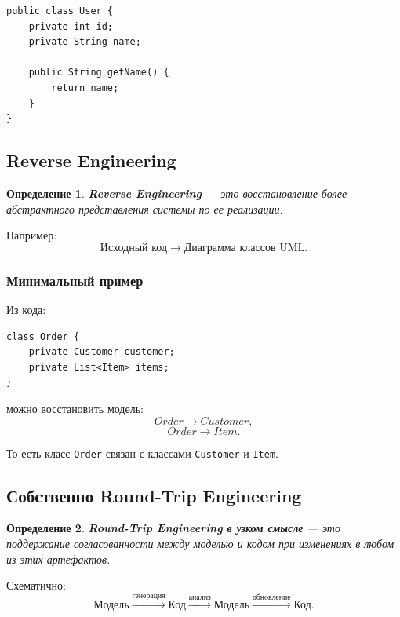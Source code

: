 \documentclass[12pt,a4paper]{article}
\newtheorem{definition}{Определение}
\begin{document}
\begin{verbatim}
public class User {
    private int id;
    private String name;

    public String getName() {
        return name;
    }
}
\end{verbatim}

\subsection{Reverse Engineering}

\begin{definition}
\textbf{Reverse Engineering} --- это восстановление более абстрактного представления системы по ее реализации.
\end{definition}

Например:
\[
\text{Исходный код}
\rightarrow
\text{Диаграмма классов UML}.
\]

\subsubsection*{Минимальный пример}

Из кода:

\begin{verbatim}
class Order {
    private Customer customer;
    private List<Item> items;
}
\end{verbatim}

можно восстановить модель:
\[
Order \rightarrow Customer,
\]
\[
Order \rightarrow Item.
\]

То есть класс \texttt{Order} связан с классами \texttt{Customer} и \texttt{Item}.

\subsection{Собственно Round-Trip Engineering}

\begin{definition}
\textbf{Round-Trip Engineering в узком смысле} --- это поддержание согласованности между моделью и кодом при изменениях в любом из этих артефактов.
\end{definition}

Схематично:
\[
\text{Модель}
\xrightarrow{\text{генерация}}
\text{Код}
\xrightarrow{\text{анализ}}
\text{Модель}
\xrightarrow{\text{обновление}}
\text{Код}.
\]

\begin{center}
\end{center}
\end{document}
